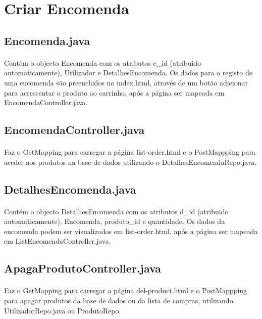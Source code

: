 \documentclass[11pt]{article}
\begin{document}
\section{Criar Encomenda}
	\subsection{Encomenda.java}
	\paragraph{}
	Contém o objecto Encomenda com os atributos e\_id (atribuido automaticamente), Utilizador e DetalhesEncomenda. Os dados para o registo de uma encomenda são preenchidos no index.html, através de um botão adicionar para acrescentar o produto ao carrinho, após a página ser mapeada em EncomendaController.java.
	
	\subsection{EncomendaController.java}
	\paragraph{}
	Faz o GetMapping para carregar a página list-order.html e o PostMappping para aceder aos produtos na base de dados utilizando o DetalhesEncomendaRepo.java.
	
	\subsection{DetalhesEncomenda.java}
	\paragraph{}
	Contém o objecto DetalhesEncomenda com os atributos d\_id (atribuido automaticamente), Encomenda, produto\_id e quantidade. Os dados da encomenda podem ser visualizados em list-order.html, após a página ser mapeada em ListEncomendaController.java.

	\subsection{ApagaProdutoController.java}
	\paragraph{}
	Faz o GetMapping para carregar a página del-product.html e o PostMappping para apagar produtos da base de dados ou da lista de compras, utilizando UtilizadorRepo.java ou ProdutoRepo.
\end{document}
